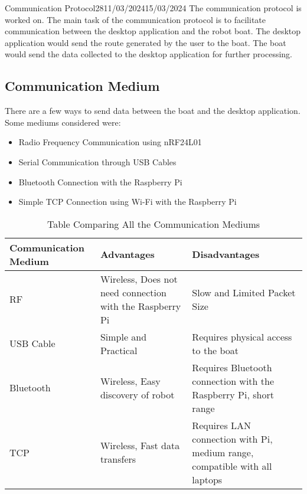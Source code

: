 \documentclass[12pt]{article}
\begin{document}
\begin{logbook-entry}{Communication Protocol}{28}{11/03/2024}{15/03/2024}
The communication protocol is worked on.
The main task of the communication protocol is to facilitate communication between the desktop application and the robot boat.
The desktop application would send the route generated by the user to the boat.
The boat would send the data collected to the desktop application for further processing.

\subsection*{Communication Medium}

There are a few ways to send data between the boat and the desktop application.
Some mediums considered were:

\begin{itemize}
    \item Radio Frequency Communication using nRF24L01
    \item Serial Communication through USB Cables
    \item Bluetooth Connection with the Raspberry Pi
    \item Simple TCP Connection using Wi-Fi with the Raspberry Pi
\end{itemize}

\begin{table}[ht]
    \centering
    \caption{Table Comparing All the Communication Mediums}
    \label{tab:comm-medium}
    \vspace{1em}
    \begin{tabular}{ p{7em} p{10em} p{10em} }
        Communication Medium & Advantages                                               & Disadvantages                                                              \\
        \hline
        RF                   & Wireless, Does not need connection with the Raspberry Pi & Slow and Limited Packet Size                                               \\
        \hline
        USB Cable            & Simple and Practical                                     & Requires physical access to the boat                                       \\
        \hline
        Bluetooth            & Wireless, Easy discovery of robot                        & Requires Bluetooth connection with the Raspberry Pi, short range           \\
        \hline
        TCP                  & Wireless, Fast data transfers                            & Requires LAN connection with Pi, medium range, compatible with all laptops \\
        \hline
    \end{tabular}
\end{table}


\end{logbook-entry}
\end{document}
